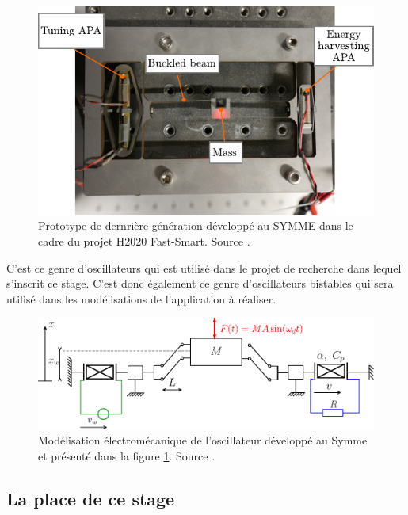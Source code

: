 \documentclass[a4paper, french, 12pt, titlepage]{article}
\begin{document}
\begin{figure}
  \begin{center}
    \includegraphics[width=.8\linewidth]{prototype_picture}
  \end{center}

  \caption{Prototype de dernrière génération développé au SYMME dans le cadre du projet H2020 Fast-Smart.
    Source \cite{csaintmartin2023preprint}.}
  \label{fig:prototype}
\end{figure}

C'est ce genre d'oscillateurs qui est utilisé dans le projet de recherche dans lequel s'inscrit ce stage.
C'est donc également ce genre d'oscillateurs bistables qui sera utilisé dans les modélisations de l'application à réaliser.\\

\begin{figure}
  \begin{center}
    \includegraphics[width = 1\textwidth]{images/bistable}
  \end{center}
  \caption{Modélisation électromécanique de l'oscillateur développé au Symme et présenté dans la figure \ref{fig:prototype}.
    Source \cite{csaintmartin2023preprint}.}
  \label{fig:model}
\end{figure}

\subsection{La place de ce stage}
\end{document}
